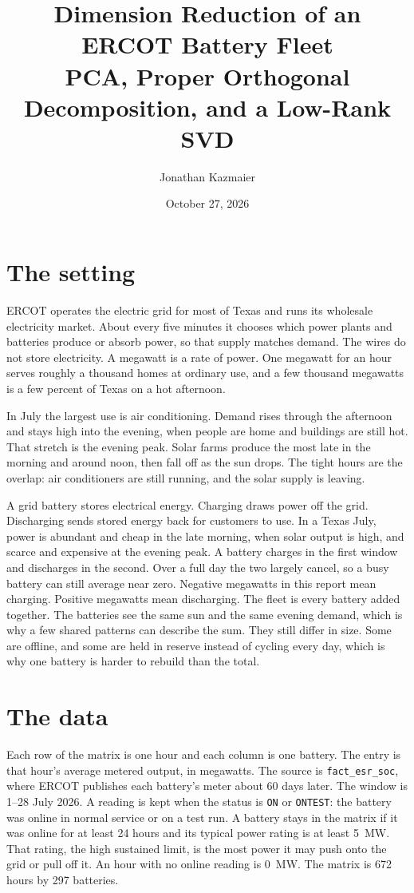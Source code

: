 \documentclass[12pt]{article}
\title{Dimension Reduction of an ERCOT Battery Fleet\\
\large PCA, Proper Orthogonal Decomposition, and a Low-Rank SVD}
\author{Jonathan Kazmaier}
\date{October 27, 2026}
\begin{document}
\maketitle
\vspace{-1.2em}

\section{The setting}

ERCOT operates the electric grid for most of Texas and runs its wholesale electricity market.
About every five minutes it chooses which power plants and batteries produce or absorb power, so that supply matches demand.
The wires do not store electricity.
A megawatt is a rate of power.
One megawatt for an hour serves roughly a thousand homes at ordinary use, and a few thousand megawatts is a few percent of Texas on a hot afternoon.

In July the largest use is air conditioning.
Demand rises through the afternoon and stays high into the evening, when people are home and buildings are still hot.
That stretch is the evening peak.
Solar farms produce the most late in the morning and around noon, then fall off as the sun drops.
The tight hours are the overlap: air conditioners are still running, and the solar supply is leaving.

A grid battery stores electrical energy.
Charging draws power off the grid.
Discharging sends stored energy back for customers to use.
In a Texas July, power is abundant and cheap in the late morning, when solar output is high, and scarce and expensive at the evening peak.
A battery charges in the first window and discharges in the second.
Over a full day the two largely cancel, so a busy battery can still average near zero.
Negative megawatts in this report mean charging.
Positive megawatts mean discharging.
The fleet is every battery added together.
The batteries see the same sun and the same evening demand, which is why a few shared patterns can describe the sum.
They still differ in size.
Some are offline, and some are held in reserve instead of cycling every day, which is why one battery is harder to rebuild than the total.

\section{The data}

Each row of the matrix is one hour and each column is one battery.
The entry is that hour's average metered output, in megawatts.
The source is \texttt{fact\_esr\_soc}, where ERCOT publishes each battery's meter about 60 days later.
The window is 1--28 July 2026.
A reading is kept when the status is \texttt{ON} or \texttt{ONTEST}: the battery was online in normal service or on a test run.
A battery stays in the matrix if it was online for at least 24 hours and its typical power rating is at least 5~MW.
That rating, the high sustained limit, is the most power it may push onto the grid or pull off it.
An hour with no online reading is 0~MW.
The matrix is 672 hours by 297 batteries.
\end{document}
